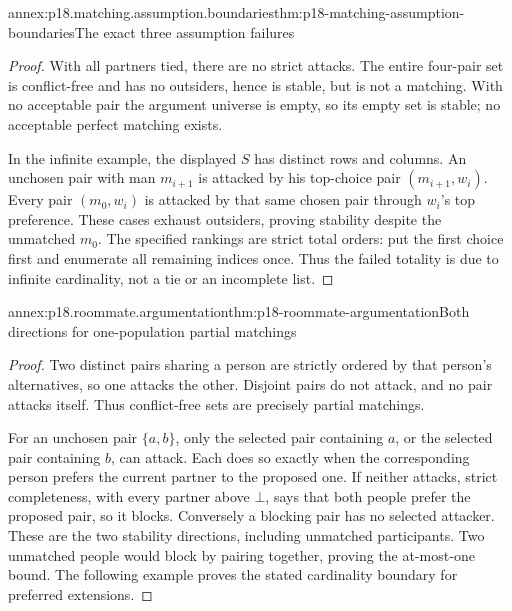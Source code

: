 \begin{annexitem}{annex:p18.matching.assumption.boundaries}{thm:p18-matching-assumption-boundaries}{The exact three assumption failures}
\begin{proof}
With all partners tied, there are
no strict attacks. The entire
four-pair set is conflict-free
and has no outsiders, hence
is stable, but is not a
matching. With no acceptable
pair the argument universe
is empty, so its empty
set is stable; no acceptable
perfect matching exists.

In the infinite example,
the displayed \(S\) has
distinct rows and columns.
An unchosen pair with
man \(m_{i+1}\) is attacked
by his top-choice pair
\((m_{i+1},w_i)\).
Every pair \((m_0,w_i)\)
is attacked by that same
chosen pair through
\(w_i\)'s top preference.
These cases exhaust
outsiders, proving
stability despite the
unmatched \(m_0\).
The specified rankings
are strict total orders:
put the first choice
first and enumerate all
remaining indices once.
Thus the failed totality
is due to infinite
cardinality, not a tie
or an incomplete list.
\end{proof}
\end{annexitem}

\begin{annexitem}{annex:p18.roommate.argumentation}{thm:p18-roommate-argumentation}{Both directions for one-population partial matchings}
\begin{proof}
Two distinct pairs sharing a person
are strictly ordered by that person's
alternatives, so one attacks the
other. Disjoint pairs do not
attack, and no pair attacks
itself. Thus conflict-free sets
are precisely partial matchings.

For an unchosen pair \(\{a,b\}\),
only the selected pair containing
\(a\), or the selected pair
containing \(b\), can attack.
Each does so exactly when
the corresponding person prefers
the current partner to the
proposed one. If neither
attacks, strict completeness,
with every partner above
\(\bot\), says that both
people prefer the proposed
pair, so it blocks.
Conversely a blocking
pair has no selected
attacker. These are
the two stability
directions, including
unmatched participants.
Two unmatched people
would block by pairing
together, proving the
at-most-one bound.
The following example
proves the stated
cardinality boundary
for preferred extensions.
\end{proof}
\end{annexitem}


